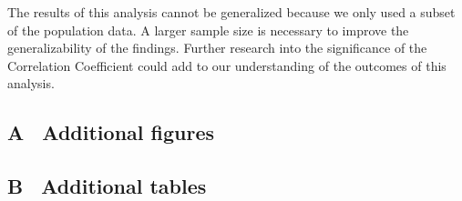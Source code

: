 \documentclass[12 pt]{scrartcl}
\begin{document}
The results of this analysis cannot be generalized because we only used a subset of the population data. A larger sample size is necessary to improve the generalizability of the findings.  Further research into the significance of the Correlation Coefficient could add to our understanding of the outcomes of this analysis.


\newpage
{}
\renewcommand\refname{Bibliography} 



\newpage
\appendix 
{}
\subsection*{A \ Additional figures}
\subsection*{B \ Additional tables}
\end{document}
